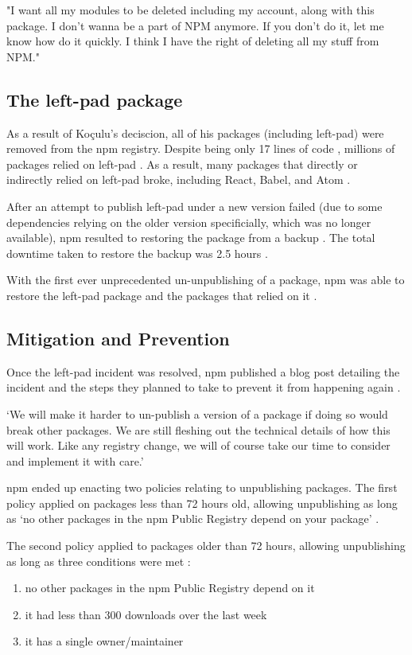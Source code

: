 \documentclass[acmsmall]{acmart}
\begin{document}
"I want all my modules to be deleted including my account, along with this
package. I don't wanna be a part of NPM anymore. If you don't do it, let me know
how do it quickly. I think I have the right of deleting all my stuff from NPM."
\cite{medium-mikeroberts}

\subsection{The left-pad package}
As a result of Koçulu's deciscion, all of his packages (including left-pad) were
removed from the npm registry. Despite being only 17 lines of code
\cite{github-leftpad-code}, millions of packages relied on left-pad
\cite{github-leftpad-dependency}. As a result, many packages that directly or
indirectly relied on left-pad broke, including React, Babel, and Atom
\cite{npmblog-leftpad}.

After an attempt to publish left-pad under a new version failed (due to some
dependencies relying on the older version specificially, which was no longer
available), npm resulted to restoring the package from a backup
\cite{npmblog-leftpad}. The total downtime taken to restore the backup was 2.5
hours \cite{npmblog-leftpad}.

With the first ever unprecedented un-unpublishing of a package, npm was able to
restore the left-pad package and the packages that relied on it
\cite{npmblog-leftpad}.

\subsection{Mitigation and Prevention}
Once the left-pad incident was resolved, npm published a blog post detailing the
incident and the steps they planned to take to prevent it from happening again
\cite{npmblog-leftpad}.

`We will make it harder to un-publish a version of a package if doing so would
break other packages. We are still fleshing out the technical details of how
this will work. Like any registry change, we will of course take our time to
consider and implement it with care.' \cite{npmblog-leftpad}

npm ended up enacting two policies relating to unpublishing packages. The first
policy applied on packages less than 72 hours old, allowing
unpublishing as long as `no other packages in the npm Public Registry depend on
your package' \cite{npm-docs-unpublishing}.

The second policy applied to packages older than 72 hours, allowing
unpublishing as long as three conditions were met \cite{npm-docs-unpublishing}:
\begin{enumerate}
  \item no other packages in the npm Public Registry depend on it
  \item it had less than 300 downloads over the last week
  \item it has a single owner/maintainer
\end{enumerate}
\end{document}
